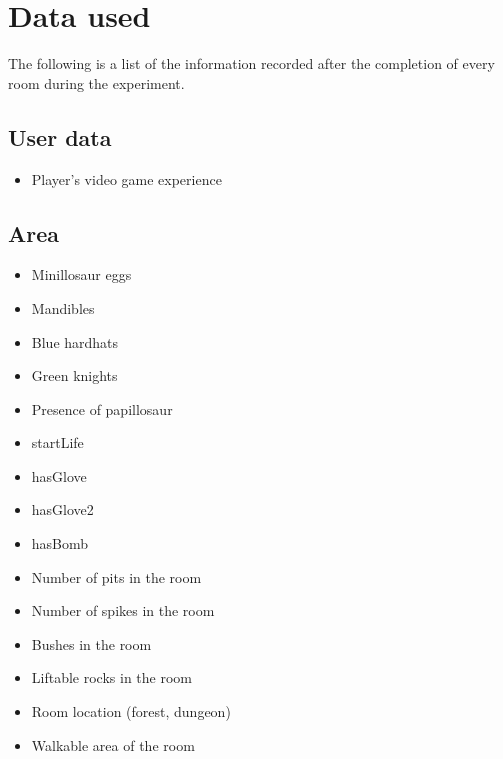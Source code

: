 \documentclass[a4paper]{article}
\begin{document}
\clearpage
\appendix
\section{Data used}
The following is a list of the information recorded after the completion of every room during the experiment.

\begin{multicols}{2}
\subsection{User data}
\begin{itemize}
\item Player's video game experience
\end{itemize}
\subsection{Area}
\begin{itemize}
\item Minillosaur eggs
\item Mandibles
\item Blue hardhats
\item Green knights
\item Presence of papillosaur
\item startLife
\item hasGlove
\item hasGlove2
\item hasBomb
\item Number of pits in the room
\item Number of spikes in the room
\item Bushes in the room
\item Liftable rocks in the room
\item Room location (forest, dungeon)
\item Walkable area of the room
\end{itemize}

\end{multicols}
\end{document}
